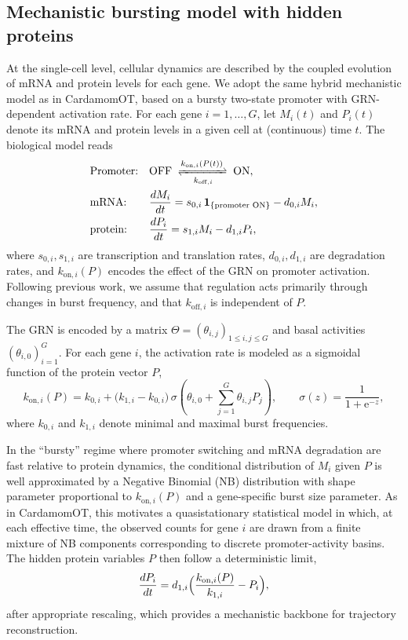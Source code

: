 \documentclass[10pt]{article}
\begin{document}
\subsection{Mechanistic bursting model with hidden proteins}

At the single-cell level, cellular dynamics are described by the coupled evolution of mRNA and protein levels for each gene. We adopt the same hybrid mechanistic model as in CardamomOT, based on a bursty two-state promoter with GRN-dependent activation rate.  For each gene $i=1,\dots,G$, let $M_i(t)$ and $P_i(t)$ denote its mRNA and protein levels in a given cell at (continuous) time $t$. The biological model reads
\[
\begin{aligned}
&\text{Promoter:} &&\text{OFF} \;\xrightleftharpoons[k_{\mathrm{off},i}]{k_{\mathrm{on},i}(P(t))}\; \text{ON},\\
&\text{mRNA:} &&\frac{d M_i}{dt} = s_{0,i} \,\mathbf{1}_{\{\text{promoter ON}\}} - d_{0,i} M_i,\\
&\text{protein:} &&\frac{d P_i}{dt} = s_{1,i} M_i - d_{1,i} P_i,
\end{aligned}
\]
where $s_{0,i}, s_{1,i}$ are transcription and translation rates, $d_{0,i}, d_{1,i}$ are degradation rates, and $k_{\mathrm{on},i}(P)$ encodes the effect of the GRN on promoter activation.  Following previous work, we assume that regulation acts primarily through changes in burst frequency, and that $k_{\mathrm{off},i}$ is independent of $P$. 

The GRN is encoded by a matrix $\Theta = (\theta_{i,j})_{1\leq i,j\leq G}$ and basal activities $(\theta_{i,0})_{i=1}^G$. For each gene $i$, the activation rate is modeled as a sigmoidal function of the protein vector $P$,
\[
k_{\mathrm{on},i}(P) 
= k_{0,i} + \bigl(k_{1,i}-k_{0,i}\bigr)\,\sigma\!\left(\theta_{i,0} + \sum_{j=1}^G \theta_{i,j} P_j\right),
\qquad
\sigma(z)=\frac{1}{1+\mathrm{e}^{-z}},
\]
where $k_{0,i}$ and $k_{1,i}$ denote minimal and maximal burst frequencies. 

In the ``bursty'' regime where promoter switching and mRNA degradation are fast relative to protein dynamics, the conditional distribution of $M_i$ given $P$ is well approximated by a Negative Binomial (NB) distribution with shape parameter proportional to $k_{\mathrm{on},i}(P)$ and a gene-specific burst size parameter.  As in CardamomOT, this motivates a quasistationary statistical model in which, at each effective time, the observed counts for gene $i$ are drawn from a finite mixture of NB components corresponding to discrete promoter-activity basins.  The hidden protein variables $P$ then follow a deterministic limit,
\[
\frac{dP_i}{dt} = d_{1,i}\Bigl(\frac{k_{\mathrm{on},i}(P)}{k_{1,i}} - P_i\Bigr),
\]
after appropriate rescaling, which provides a mechanistic backbone for trajectory reconstruction. 
\end{document}
